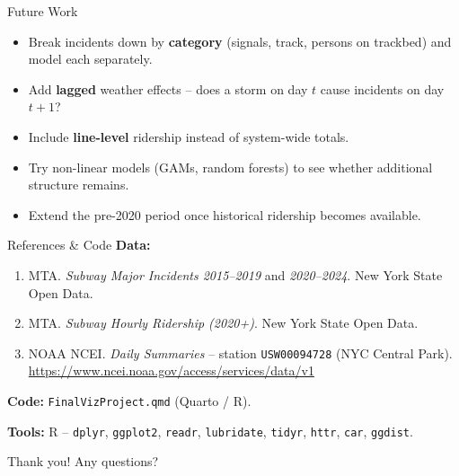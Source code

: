 \documentclass[aspectratio=43]{beamer}
\begin{document}
\begin{frame}{Future Work}
\begin{itemize}
  \item Break incidents down by \textbf{category} (signals, track, persons on trackbed) and model each separately.
  \item Add \textbf{lagged} weather effects -- does a storm on day $t$ cause incidents on day $t+1$?
  \item Include \textbf{line-level} ridership instead of system-wide totals.
  \item Try non-linear models (GAMs, random forests) to see whether additional structure remains.
  \item Extend the pre-2020 period once historical ridership becomes available.
\end{itemize}
\end{frame}

\begin{frame}{References \& Code}
\small
\textbf{Data:}
\begin{enumerate}
  \item MTA. \textit{Subway Major Incidents 2015--2019} and \textit{2020--2024}. New York State Open Data.
  \item MTA. \textit{Subway Hourly Ridership (2020+)}. New York State Open Data.
  \item NOAA NCEI. \textit{Daily Summaries} -- station \texttt{USW00094728} (NYC Central Park). \\
    \url{https://www.ncei.noaa.gov/access/services/data/v1}
\end{enumerate}

\textbf{Code:} \texttt{FinalVizProject.qmd} (Quarto / R).

\textbf{Tools:} R -- \texttt{dplyr}, \texttt{ggplot2}, \texttt{readr}, \texttt{lubridate}, \texttt{tidyr}, \texttt{httr}, \texttt{car}, \texttt{ggdist}.
\end{frame}

{
\begin{frame}[plain]
\vfill
\begin{center}
{\Large Thank you! Any questions?}
\end{center}
\vfill
\end{frame}
}
\end{document}
